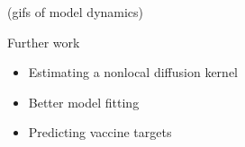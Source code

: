 \documentclass{beamer}
\begin{document}
    



\begin{frame}
    (gifs of model dynamics)
\end{frame}


\begin{frame}{Further work}
    \begin{itemize}
        \item Estimating a nonlocal diffusion kernel
        \item Better model fitting
        \item Predicting vaccine targets
    \end{itemize}
\end{frame}

    
\end{document}
